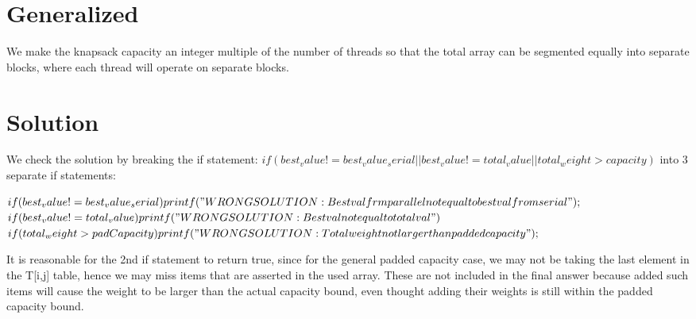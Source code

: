 \documentclass[11pt]{amsart}
\begin{document}
\section{Generalized}
We make the knapsack capacity an integer multiple of the number of threads so that the total array can be segmented equally into separate blocks, where each thread will operate on separate blocks.

\section{Solution}
We check the solution by breaking the if statement: 
$if( best_value != best_value_serial || best_value != total_value || total_weight > capacity )$
into 3 separate if statements:

$ if( best_value != best_value_serial ) printf( "WRONG SOLUTION: Best val frm parallel not equal to best val from serial" ); $
$ if( best_value != total_value ) printf("WRONG SOLUTION: Best val not equal to total val")$
$ if( total_weight > padCapacity ) printf( "WRONG SOLUTION: Total weight not larger than padded capacity" );$ 

It is reasonable for the 2nd if statement to return true, since for the general padded capacity case, we may not be taking the last element in the T[i,j] table, hence we may miss items that are asserted in the used array. These are not included in the final answer because added such items will cause the weight to be larger than the actual capacity bound, even thought adding their weights is still within the padded capacity bound.
\end{document}
